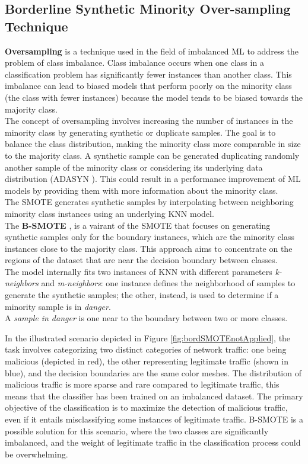 \subsection{Borderline Synthetic Minority Over-sampling Technique}
\label{subsec:borderline}

\textbf{Oversampling} is a technique used in the field of imbalanced ML to address the problem of class imbalance. 
Class imbalance occurs when one class in a classification problem has significantly fewer instances than another class. 
This imbalance can lead to biased models that perform poorly on the minority class (the class with fewer instances) because the model tends to be biased towards the majority class.\\
The concept of oversampling involves increasing the number of instances in the minority class by generating synthetic or duplicate samples. 
The goal is to balance the class distribution, making the minority class more comparable in size to the majority class. 
A synthetic sample can be generated duplicating randomly another sample of the minority class or considering its underlying data distribution (ADASYN \cite{adasyn:2008}).
This could result in a performance improvement of ML models by providing them with more information about the minority class.\\
The SMOTE generates synthetic samples by interpolating between neighboring minority class instances using an underlying KNN model.\\

The \textbf{B-SMOTE} \cite{Han2005BorderlineSMOTEAN:2005}, is a vairant of the SMOTE that focuses on generating synthetic samples only for the boundary instances, which are the minority class instances close to the majority class. 
This approach aims to concentrate on the regions of the dataset that are near the decision boundary between classes. \\
The model internally fits two instances of KNN with different parameters \textit{k-neighbors} and \textit{m-neighbors}: one instance defines the neighborhood of samples to generate the synthetic samples; the other, instead, is used to determine if a minority sample is in \textit{danger}.\\
A \textit{sample in danger} is one near to the boundary between two or more classes.

In the illustrated scenario depicted in Figure \ref{fig:bordSMOTEnotApplied}, the task involves categorizing two distinct categories of network traffic: 
one being malicious (depicted in red), the other representing legitimate traffic (shown in blue), and the decision boundaries are the same color meshes.
The distribution of malicious traffic is more sparse and rare compared to legitimate traffic, this means that the classifier has been trained on an imbalanced dataset. 
The primary objective of the classification is to maximize the detection of malicious traffic, even if it entails misclassifying some instances of legitimate traffic. 
B-SMOTE is a possible solution for this scenario, where the two classes are significantly imbalanced, and the weight of legitimate traffic in the classification process could be overwhelming.

